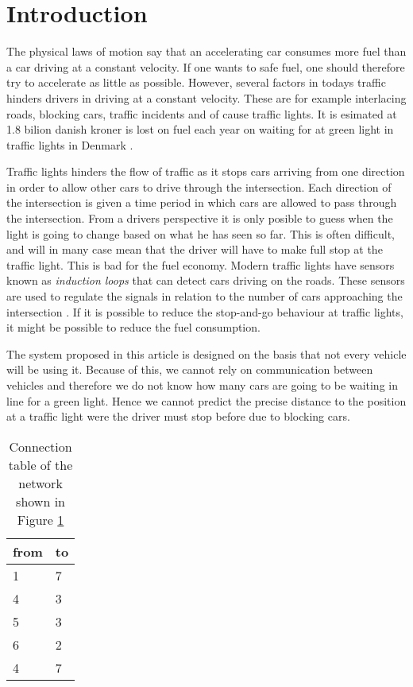 \section{Introduction}

The physical laws of motion say that an accelerating car consumes more fuel than a car driving at a constant velocity. %
If one wants to safe fuel, one should therefore try to accelerate as little as possible. 
However, several factors in todays traffic hinders drivers in driving at a constant velocity. 
These are for example interlacing roads, blocking cars, traffic incidents and of cause traffic lights. 
It is esimated at 1.8 bilion danish kroner is lost on fuel each year on waiting for at green light in traffic lights in Denmark \cite{Vejdir}.

Traffic lights hinders the flow of traffic as it stops cars arriving from one direction in order to allow other cars to drive through the intersection.
Each direction of the intersection is given a time period in which cars are allowed to pass through the intersection. 
From a drivers perspective it is only posible to guess when the light is going to change based on what he has seen so far. 
This is often difficult, and will in many case mean that the driver will have to make full stop at the traffic light. This is bad for the fuel economy.
Modern traffic lights have sensors known as \textit{induction loops} that can detect cars driving on the roads.
These sensors are used to regulate the signals in relation to the number of cars approaching the intersection \cite{Vejdir}.
If it is possible to reduce the stop-and-go behaviour at traffic lights, it might be possible to reduce the fuel consumption.




The system proposed in this article is designed on the basis that not every vehicle will be using it. 
Because of this, we cannot rely on communication between vehicles and therefore we do not know how many cars are going to be waiting in line for a green light. %
Hence we cannot predict the precise distance to the position at a traffic light were the driver must stop before due to blocking cars.


\begin{table}[h]
\centering
\begin{tabular}{|l|l|}
\hline
from & to \\ \hline
1 & 7 \\ \hline
4 & 3 \\ \hline
5 & 3 \\ \hline
6 & 2 \\ \hline
4 & 7 \\ \hline
\end{tabular}
\caption{Connection table of the network shown in Figure \ref{}}
\label{tab:Introduction:connectionTable}
\end{table}


